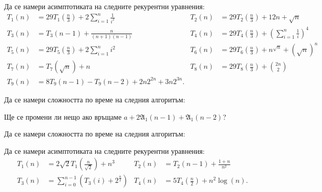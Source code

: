 \begin{problem}
Да се намери асимптотиката на следните рекурентни уравнения:
\begin{align*}
    T_1(n) & = 29T_1(\frac{n}{3}) + 2 \sum\limits_{i = 1}^n \frac{1}{i^2} & T_2(n) & = 29T_2(\frac{n}{3}) + 12n + \sqrt{n}                        \\
    T_3(n) & = T_3(n - 1) + \frac{n}{(n + 1)(n - 1)}                      & T_4(n) & = 29T_4(\frac{n}{3}) + (\sum\limits_{i = 1}^n \frac{1}{i})^4 \\
    T_5(n) & = 29T_5(\frac{n}{3}) + 2 \sum\limits_{i = 1}^n i^2           & T_6(n) & = 29T_6(\frac{n}{3}) + n^{\sqrt{n}} + (\sqrt{n})^n           \\
    T_7(n) & = T_7(\sqrt{n}) + n                                          & T_8(n) & = 29T_8(\frac{n}{3}) + \binom{2n}{2}                         \\
    T_9(n) & = 8T_9(n - 1) - T_9(n - 2) + 2n2^{2n} + 3n2^{3n}.            &        &
\end{align*}
\end{problem}

\begin{problem}
Да се намери сложността по време на следния алгоритъм:

Ще се промени ли нещо ако връщаме $a + 2 \mathfrak{A}_1(n - 1) + \mathfrak{A}_1(n - 2)$?
\end{problem}

\newpage

\begin{problem}
Да се намери сложността по време на следния алгоритъм:

\end{problem}

\begin{problem}
Да се намери асимптотиката на следните рекурентни уравнения:
\begin{align*}
    T_1(n) & = 2 \sqrt{2} T_1\left(\frac{n}{\sqrt{2}}\right) + n^3              & T_2(n) & = T_2(n - 1) + \frac{1 + n}{n^2}             \\
    T_3(n) & = \sum\limits_{i = 0}^{n - 1}\left(T_3(i) + 2^{\frac{n}{2}}\right) & T_4(n) & = 5 T_4\left(\frac{n}{2}\right) + n^2 \log(n).
\end{align*}
\end{problem}